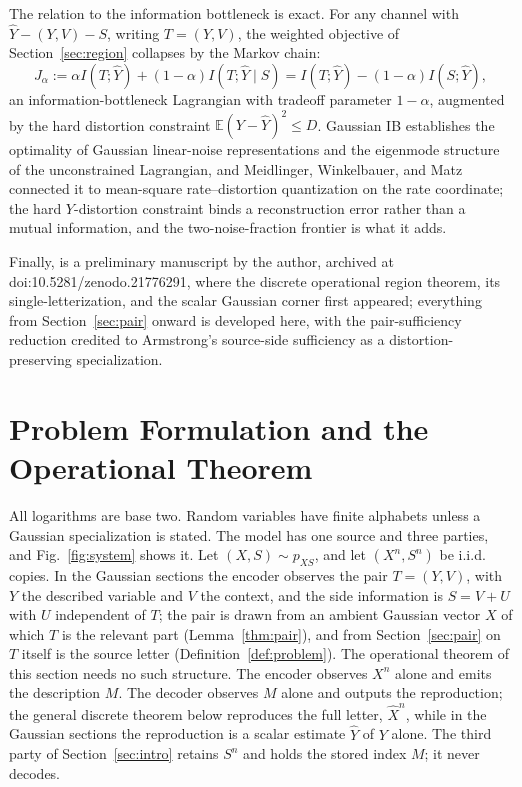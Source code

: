 \documentclass[11pt,onecolumn]{IEEEtran}
\newcommand{\E}{\mathbb{E}}
\newcommand{\hXn}{\widehat{X}^{n}}
\newcommand{\hY}{\widehat{Y}}
\begin{document}
The relation to the information bottleneck \cite{tishby1999} is exact.
For any channel with $\hY-(Y,V)-S$, writing $T=(Y,V)$, the weighted
objective of Section~\ref{sec:region} collapses by the Markov chain:
\begin{equation}
J_\alpha:=\alpha I(T;\hY)+(1-\alpha)I(T;\hY\mid S)
=I(T;\hY)-(1-\alpha)I(S;\hY),
\label{eq:ib-identity}
\end{equation}
an information-bottleneck Lagrangian with tradeoff parameter
$1-\alpha$, augmented by the hard distortion constraint
$\E(Y-\hY)^2\le D$. Gaussian IB \cite{chechik2005} establishes the
optimality of Gaussian linear-noise representations and the eigenmode
structure of the unconstrained Lagrangian, and Meidlinger, Winkelbauer,
and Matz \cite{meidlinger2014} connected it to mean-square
rate--distortion quantization on the rate coordinate; the hard
$Y$-distortion constraint binds a reconstruction error rather than a
mutual information, and the two-noise-fraction frontier is what it adds.

Finally, \cite{bond2026landauer} is a preliminary manuscript by the
author, archived at doi:10.5281/zenodo.21776291, where the discrete
operational region theorem, its single-letterization, and the scalar
Gaussian corner first appeared; everything from Section~\ref{sec:pair}
onward is developed here, with the pair-sufficiency reduction credited
to Armstrong's source-side sufficiency \cite{armstrong2026} as a
distortion-preserving specialization.

\section{Problem Formulation and the Operational Theorem}
\label{sec:operational}

All logarithms are base two. Random variables have finite alphabets unless a
Gaussian specialization is stated. The model has one source and three
parties, and Fig.~\ref{fig:system} shows it. Let $(X,S)\sim p_{XS}$, and let
$(X^n,S^n)$ be i.i.d. copies. In the Gaussian sections the encoder observes
the pair $T=(Y,V)$, with $Y$ the described variable and $V$ the context, and
the side information is $S=V+U$ with $U$ independent of $T$; the pair is
drawn from an ambient Gaussian vector $X$ of which $T$ is the relevant
part (Lemma~\ref{thm:pair}), and from Section~\ref{sec:pair} on $T$
itself is the source letter (Definition~\ref{def:problem}). The
operational theorem of this section needs no such structure. The encoder observes $X^n$
alone and emits the description $M$. The decoder observes $M$ alone and
outputs the reproduction; the general discrete theorem below reproduces the
full letter, $\hXn$, while in the Gaussian sections the reproduction is a
scalar estimate $\hY$ of $Y$ alone. The third party of
Section~\ref{sec:intro} retains $S^n$ and holds the stored index $M$; it
never decodes.
\end{document}
